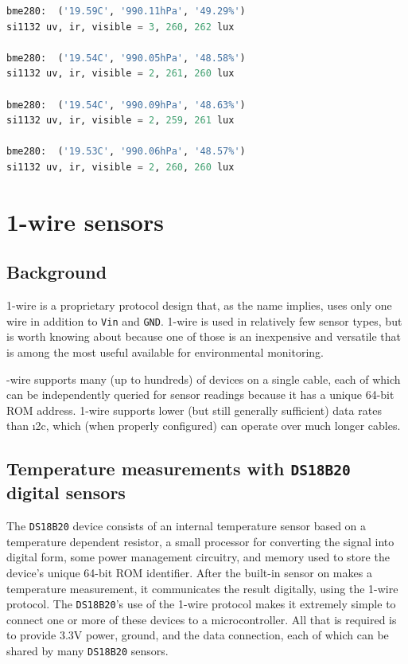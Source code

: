 \begin{enumerate}
\begin{lstlisting}[language=Python]
bme280:  ('19.59C', '990.11hPa', '49.29%')
si1132 uv, ir, visible = 3, 260, 262 lux

bme280:  ('19.54C', '990.05hPa', '48.58%')
si1132 uv, ir, visible = 2, 261, 260 lux

bme280:  ('19.54C', '990.09hPa', '48.63%')
si1132 uv, ir, visible = 2, 259, 261 lux

bme280:  ('19.53C', '990.06hPa', '48.57%')
si1132 uv, ir, visible = 2, 260, 260 lux
\end{lstlisting}

\end{enumerate}

\newpage

\section{1-wire sensors}
\subsection{Background}
1-wire is a proprietary protocol design that, as the name implies, uses only one wire in addition to \texttt{Vin} and \texttt{GND}.
1-wire is used in relatively few sensor types, but is worth knowing about because one of those is an inexpensive and versatile  that is among the most useful available for environmental monitoring.

-wire supports many (up to hundreds) of devices on a single cable, each of which can be independently queried for sensor readings because it has a unique 64-bit ROM address.
1-wire supports lower (but still generally sufficient) data rates than \i2c, which (when properly configured) can operate over much longer cables.

\subsection{Temperature measurements with \texttt{DS18B20} digital sensors}
The \texttt{DS18B20} device consists of an internal temperature sensor based on a temperature dependent resistor, a small processor for converting the signal into digital form, some power management circuitry, and memory used to store the device's unique 64-bit ROM identifier.
After the built-in sensor on makes a temperature measurement, it communicates the result digitally, using the 1-wire protocol.
The \texttt{DS18B20}'s use of the 1-wire protocol makes it extremely simple to connect one or more of these devices to a microcontroller.
All that is required is to provide 3.3V power, ground, and the data connection, each of which can be shared by many \texttt{DS18B20} sensors.  

